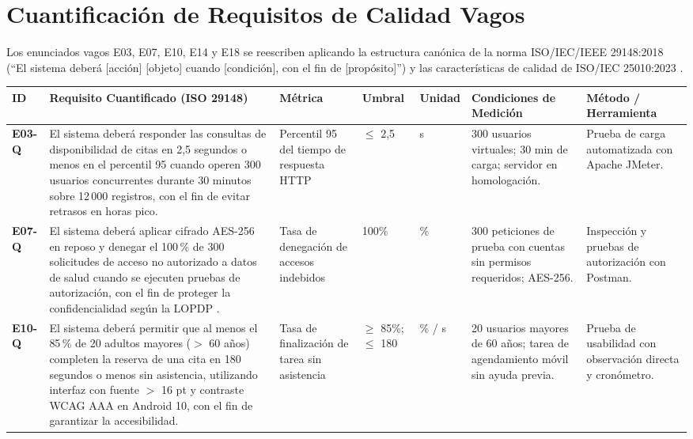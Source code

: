 \documentclass[conference]{IEEEtran}
\begin{document}
\section{Cuantificaci\'on de Requisitos de Calidad Vagos}
Los enunciados vagos E03, E07, E10, E14 y E18 se reescriben aplicando la estructura can\'onica de la norma ISO/IEC/IEEE 29148:2018 (``El sistema deber\'a [acci\'on] [objeto] cuando [condici\'on], con el fin de [prop\'osito]'') y las caracter\'isticas de calidad de ISO/IEC 25010:2023 \cite{iso29148,iso25010}.

\vspace{0.25cm}
\begin{center}
\scriptsize
\setlength{\tabcolsep}{3pt}
\begin{tabular}{@{}p{0.7cm}p{5.1cm}p{2.3cm}p{1.4cm}p{0.8cm}p{2.8cm}p{2.8cm}@{}}
\toprule
\textbf{ID} & \textbf{Requisito Cuantificado (ISO 29148)} & \textbf{M\'etrica} & \textbf{Umbral} & \textbf{Unidad} & \textbf{Condiciones de Medici\'on} & \textbf{M\'etodo / Herramienta}\\
\midrule
\textbf{E03-Q} & El sistema deber\'a responder las consultas de disponibilidad de citas en 2,5 segundos o menos en el percentil 95 cuando operen 300 usuarios concurrentes durante 30 minutos sobre 12\,000 registros, con el fin de evitar retrasos en horas pico. & Percentil 95 del tiempo de respuesta HTTP & $\le$ 2{,}5 & s & 300 usuarios virtuales; 30 min de carga; servidor en homologaci\'on. & Prueba de carga automatizada con Apache JMeter.\\
\addlinespace[3pt]
\textbf{E07-Q} & El sistema deber\'a aplicar cifrado AES-256 en reposo y denegar el 100\,\% de 300 solicitudes de acceso no autorizado a datos de salud cuando se ejecuten pruebas de autorizaci\'on, con el fin de proteger la confidencialidad seg\'un la LOPDP \cite{lopdp2021}. & Tasa de denegaci\'on de accesos indebidos & 100\% & \% & 300 peticiones de prueba con cuentas sin permisos requeridos; AES-256. & Inspecci\'on y pruebas de autorizaci\'on con Postman.\\
\addlinespace[3pt]
\textbf{E10-Q} & El sistema deber\'a permitir que al menos el 85\,\% de 20 adultos mayores ($>$ 60 a\~nos) completen la reserva de una cita en 180 segundos o menos sin asistencia, utilizando interfaz con fuente $>$ 16 pt y contraste WCAG AAA en Android 10, con el fin de garantizar la accesibilidad. & Tasa de finalizaci\'on de tarea sin asistencia & $\ge$ 85\%; $\le$ 180 & \% / s & 20 usuarios mayores de 60 a\~nos; tarea de agendamiento m\'ovil sin ayuda previa. & Prueba de usabilidad con observaci\'on directa y cron\'ometro.\\

\end{tabular}
\end{center}
\end{document}
